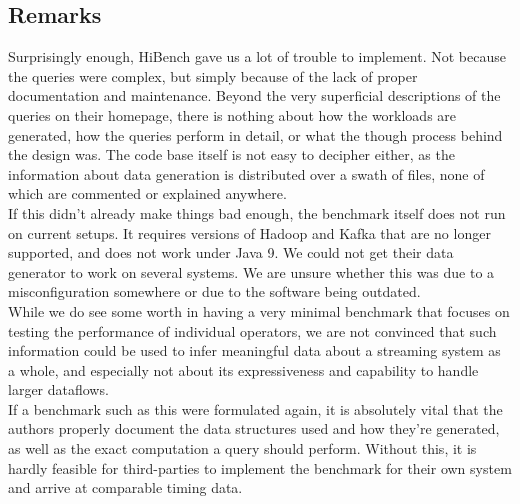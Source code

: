 \subsection{Remarks}\label{section:hibench-remarks}
Surprisingly enough, HiBench gave us a lot of trouble to implement. Not because the queries were complex, but simply because of the lack of proper documentation and maintenance. Beyond the very superficial descriptions of the queries on their homepage, there is nothing about how the workloads are generated, how the queries perform in detail, or what the though process behind the design was. The code base itself is not easy to decipher either, as the information about data generation is distributed over a swath of files, none of which are commented or explained anywhere. \\

If this didn't already make things bad enough, the benchmark itself does not run on current setups. It requires versions of Hadoop and Kafka that are no longer supported, and does not work under Java 9. We could not get their data generator to work on several systems. We are unsure whether this was due to a misconfiguration somewhere or due to the software being outdated. \\

While we do see some worth in having a very minimal benchmark that focuses on testing the performance of individual operators, we are not convinced that such information could be used to infer meaningful data about a streaming system as a whole, and especially not about its expressiveness and capability to handle larger dataflows. \\

If a benchmark such as this were formulated again, it is absolutely vital that the authors properly document the data structures used and how they're generated, as well as the exact computation a query should perform. Without this, it is hardly feasible for third-parties to implement the benchmark for their own system and arrive at comparable timing data.

